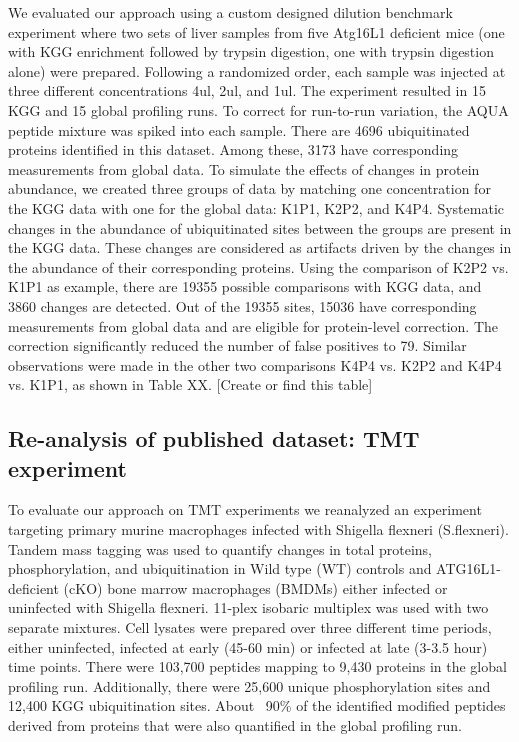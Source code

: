 \documentclass[mcp]{article}
\numberwithin{figure}{section} %
\numberwithin{table}{section}
\def\todo#1{{\color{red}[#1]}}
\begin{document}
We evaluated our approach using a custom designed dilution benchmark experiment where two sets of liver samples from five Atg16L1 deficient mice (one with KGG enrichment followed by trypsin digestion, one with trypsin digestion alone) were prepared. Following a randomized order, each sample was injected at three different concentrations 4ul, 2ul, and 1ul. The experiment resulted in 15 KGG and 15 global profiling runs. To correct for run-to-run variation, the AQUA peptide mixture was spiked into each sample. There are 4696 ubiquitinated proteins identified in this dataset. Among these, 3173 have corresponding measurements from global data.
To simulate the effects of changes in protein abundance, we created three groups of data by matching one concentration for the KGG data with one for the global data: K1P1, K2P2, and K4P4. Systematic changes in the abundance of ubiquitinated sites between the groups are present in the KGG data. These changes are considered as artifacts driven by the changes in the abundance of their corresponding proteins. Using the comparison of K2P2 vs. K1P1 as example, there are 19355 possible comparisons with KGG data, and 3860 changes are detected. Out of the 19355 sites, 15036 have corresponding measurements from global data and are eligible for protein-level correction. The correction significantly reduced the number of false positives to 79. Similar observations were made in the other two comparisons K4P4 vs. K2P2 and K4P4 vs. K1P1, as shown in Table XX. \todo{Create or find this table}

\subsection*{Re-analysis of published dataset: TMT experiment}

To evaluate our approach on TMT experiments we reanalyzed an experiment targeting primary murine macrophages infected with Shigella flexneri (S.flexneri). \cite{Maculins} Tandem mass tagging was used to quantify changes in total proteins, phosphorylation, and ubiquitination in Wild type (WT) controls and ATG16L1-deficient (cKO) bone marrow macrophages (BMDMs) either infected or uninfected with Shigella flexneri. 11-plex isobaric multiplex was used with two separate mixtures. Cell lysates were prepared over three different time periods, either uninfected, infected at early (45-60 min) or infected at late (3-3.5 hour) time points. There were 103,700 peptides mapping to 9,430 proteins in the global profiling run. Additionally, there were 25,600 unique phosphorylation sites and 12,400 KGG ubiquitination sites. About ~90\% of the identified modified peptides derived from proteins that were also quantified in the global profiling run.
\end{document}
